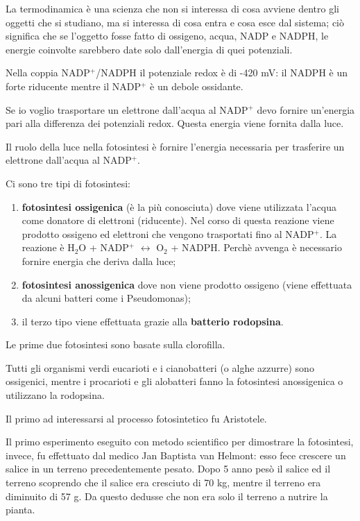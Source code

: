 \documentclass[]{article}
\begin{document}
La termodinamica è una scienza che non si interessa di cosa avviene
dentro gli oggetti che si studiano, ma si interessa di cosa entra e cosa
esce dal sistema; ciò significa che se l'oggetto fosse fatto di
ossigeno, acqua, NADP e NADPH, le energie coinvolte sarebbero date solo
dall'energia di quei potenziali.

Nella coppia NADP$^+$/NADPH il potenziale redox è di -420 mV: il NADPH è
un forte riducente mentre il NADP$^+$ è un debole ossidante.

Se io voglio trasportare un elettrone dall'acqua al NADP$^+$ devo
fornire un'energia pari alla differenza dei potenziali redox. Questa
energia viene fornita dalla luce.

Il ruolo della luce nella fotosintesi è fornire l'energia necessaria per
trasferire un elettrone dall'acqua al NADP$^+$.

Ci sono tre tipi di fotosintesi:

\begin{enumerate}
\def\labelenumi{\arabic{enumi}.}
\itemsep1pt\parskip0pt
\item
  \textbf{fotosintesi ossigenica} (è la più conosciuta) dove viene
  utilizzata l'acqua come donatore di elettroni (riducente). Nel corso
  di questa reazione viene prodotto ossigeno ed elettroni che vengono
  trasportati fino al NADP$^+$. La reazione è H$_2$O + NADP$^+$
  $\leftrightarrow$ O$_2$ + NADPH. Perchè avvenga è necessario fornire
  energia che deriva dalla luce;
\item
  \textbf{fotosintesi anossigenica} dove non viene prodotto ossigeno
  (viene effettuata da alcuni batteri come i Pseudomonas);
\item
  il terzo tipo viene effettuata grazie alla \textbf{batterio
  rodopsina}.
\end{enumerate}

Le prime due fotosintesi sono basate sulla clorofilla.

Tutti gli organismi verdi eucarioti e i cianobatteri (o alghe azzurre)
sono ossigenici, mentre i procarioti e gli alobatteri fanno la
fotosintesi anossigenica o utilizzano la rodopsina.

Il primo ad interessarsi al processo fotosintetico fu Aristotele.

Il primo esperimento eseguito con metodo scientifico per dimostrare la
fotosintesi, invece, fu effettuato dal medico Jan Baptista van Helmont:
esso fece crescere un salice in un terreno precedentemente pesato. Dopo
5 anno pesò il salice ed il terreno scoprendo che il salice era
cresciuto di 70 kg, mentre il terreno era diminuito di 57 g. Da questo
dedusse che non era solo il terreno a nutrire la pianta.
\end{document}
